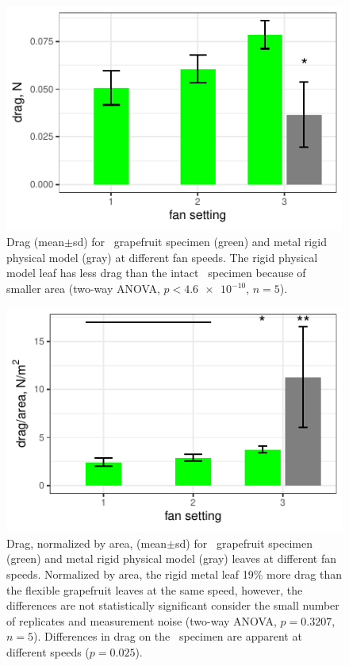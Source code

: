 \begin{figure}
\begin{center}
\includegraphics{data/results1.pdf}
\end{center}
\caption{Drag (mean$\pm$sd) for \Cxparadisi\ grapefruit specimen (green) and metal rigid physical model (gray) at different fan speeds. The rigid physical model leaf has less drag than the intact \Cxparadisi\ specimen because of smaller area (two-way ANOVA, $p<\num{4.6e-10}$, $n=5$).}
\label{fig:results:drag}
\end{figure}

\begin{figure}
\begin{center}
\includegraphics{data/results2.pdf}
\end{center}
\caption{Drag, normalized by area, (mean$\pm$sd) for \Cxparadisi\ grapefruit specimen (green) and metal rigid physical model (gray) leaves at different fan speeds. Normalized by area, the rigid metal leaf 19\% more drag than the flexible grapefruit leaves at the same speed, however, the differences are not statistically significant consider the small number of replicates and measurement noise (two-way ANOVA, $p=0.3207$, $n=5$). Differences in drag on the \Cxparadisi\ specimen are apparent at different speeds ($p=0.025$).}
\label{fig:results:dragarea}
\end{figure}






